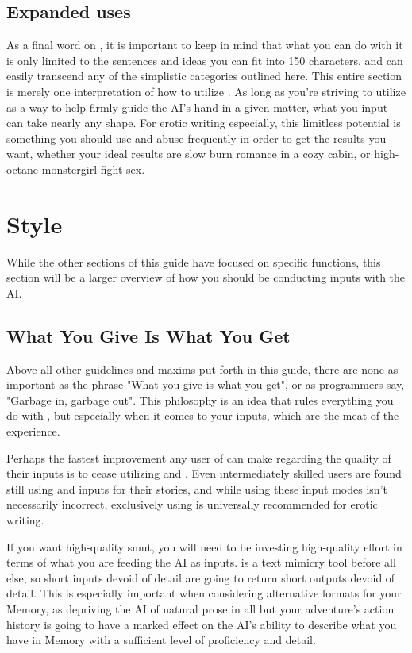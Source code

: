 ﻿\documentclass[Coomer-main.tex]{subfiles}
\begin{document}
\section{Expanded uses}

As a final word on \an, it is important to keep in mind that what you can do with it is only limited to the sentences and ideas you can fit into 150 characters, and can easily transcend any of the simplistic categories outlined here.
This entire section is merely one interpretation of how to utilize \an.
As long as you're striving to utilize \an as a way to help firmly guide the AI's hand in a given matter, what you input can take nearly any shape.
For erotic writing especially, this limitless potential is something you should use and abuse frequently in order to get the results you want, whether your ideal results are slow burn romance in a cozy cabin, or high-octane monstergirl fight-sex.

\chapter{Style}
\label{ch:style}

While the other sections of this guide have focused on specific functions, this section will be a larger overview of how you should be conducting inputs with the AI.

\section{What You Give Is What You Get}

Above all other guidelines and maxims put forth in this guide, there are none as important as the phrase "What you give is what you get", or as programmers say, "Garbage in, garbage out".
This philosophy is an idea that rules everything you do with \aid, but especially when it comes to your inputs, which are the meat of the \aid experience.

Perhaps the fastest improvement any user of \aid can make regarding the quality of their inputs is to cease utilizing \Do and \say.
Even intermediately skilled users are found still using \Do and \say inputs for their stories, and while using these input modes isn't necessarily incorrect, exclusively using \story is universally recommended for erotic writing.

If you want high-quality smut, you will need to be investing high-quality effort in terms of what you are feeding the AI as inputs. \aid is a text mimicry tool before all else, so short inputs devoid of detail are going to return short outputs devoid of detail.
This is especially important when considering alternative formats for your Memory, as depriving the AI of natural prose in all but your adventure’s action history is going to have a marked effect on the AI’s ability to describe what you have in Memory with a sufficient level of proficiency and detail.
\end{document}
